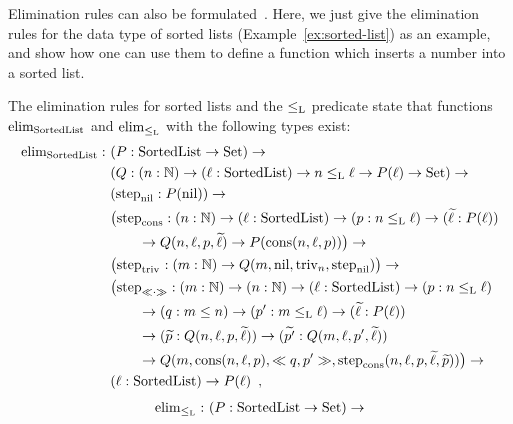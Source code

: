 \documentclass{article}
\begin{document}
Elimination rules can also be
formulated~\cite{nordvallforsbergAltenkirchMorrisSetzer2011catsemindind}. Here,
we just give the elimination rules for the data type of sorted lists
(Example~\ref{ex:sorted-list}) as an example, and show how one can use them to
define a function which inserts a number into a sorted list.

\begin{example}
  The elimination rules for sorted lists and the $\lessList$ predicate
  state that functions $\elim_{\SortedList}$ and $\elim_{\lessList}$
  with the following types exist:
  \begin{align*}
    \elim_{\SortedList} :\ & (P : \SortedList \to \Set) \to \\
                       & (Q : (n : \Nat) \to (\ell : \SortedList) \to n \lessList \ell \to P(\ell) \to \Set) \to \\
                       & (\stepind{\nilList} : P(\nilList)) \to \\
                       & \big(\stepind{\consListbare} : (n : \Nat) \to (\ell : \SortedList) \to (p : n \lessList \ell) \to (\stepindarg{\ell} : P(\ell)) \\
                       & \qquad \to Q(n, \ell, p, \stepindarg{\ell}) \to P(\consList{n}{\ell}{p})\big) \to \\
                       & \big(\stepind{\nilLess{}} : (m : \Nat) \to Q(m, \nilList, \nilLess{n}, \stepind{\nilList})\big) \to \\
                       & \big(\stepind{\consLessbare} : (m : \Nat) \to (n : \Nat) \to (\ell : \SortedList) \to (p : n \lessList \ell) \\
                       & \qquad \to (q : m \leq n) \to (p' : m \lessList \ell) \to
                       (\stepindarg{\ell} : P(\ell)) \\ 
                       & \qquad \to (\stepindarg{p} : Q(n, \ell,p, \stepindarg{\ell}))
                       \to (\stepindarg{p'} : Q(m, \ell, p', \stepindarg{\ell})) \\
                       & \qquad \to Q(m,\consList{n}{\ell}{p}, \consLess{m}{n}{\ell}{p}{q}{p'}, \stepind{\consListbare}(n, \ell, p, \stepindarg{\ell}, \stepindarg{p}))\big) \to \\
                       & (\ell : \SortedList) \to P(\ell) \enspace , \\
  \end{align*}
  \begin{align*}
% 
     \elim_{\lessList} :\ & (P : \SortedList \to \Set) \to \\

\end{align*}
\end{example}
\end{document}
